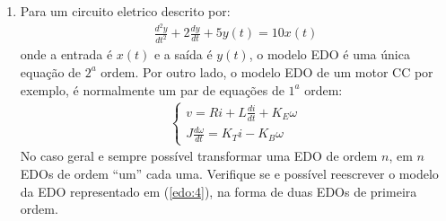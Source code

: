 \documentclass[12pt,a4paper]{article}
\begin{document}
\begin{enumerate}
\item Para um circuito eletrico descrito por:
  \begin{align}
    \frac{d^2 y}{dt^2}+2\frac{dy}{dt}+5y(t)= 10x(t)
  \end{align} 
    onde a entrada é $x(t)$ e a saída é $y(t)$, o modelo EDO é uma única equação de $2^a$ ordem.
    Por outro lado, o modelo EDO de um motor CC por exemplo, é normalmente um par de equações de $1^a$ ordem: 
    \begin{align}
      \label{edo:4}
    \begin{cases}
      v= Ri+ L\frac{di}{dt}+K_E \omega \\
      J\frac{d \omega}{dt}=K_T i - K_B \omega 
    \end{cases}
  \end{align}
  No caso geral e sempre possível transformar uma EDO de ordem $n$, em $n$ EDOs de
  ordem ``um'' cada uma. Verifique se e possível reescrever o modelo da EDO representado
  em (\ref{edo:4}), na forma de duas EDOs de primeira ordem.

\end{enumerate}
\end{document}
